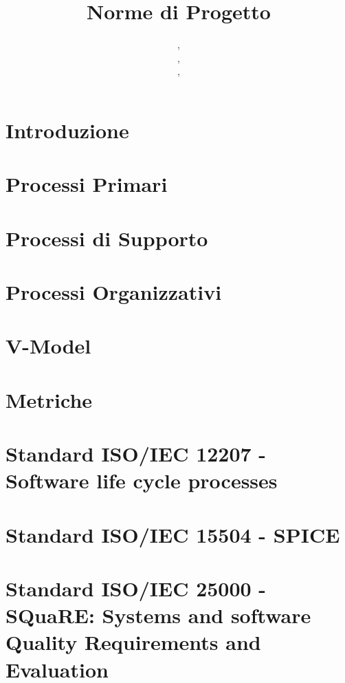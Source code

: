 \documentclass{classes/base}
\title{Norme di Progetto}
\author{\matteo, \\ \marcov, \\ \giulio, \\ \marcob}
\begin{document}
	\maketitle
	\newpage
	
	\newpage
	\tableofcontents
	\newpage
	\listoftables

	\newpage
	\section{Introduzione}
	
	
	\newpage
	\section{Processi Primari}
	
	
	\newpage
	\section{Processi di Supporto}
	
	
	\newpage
	\section{Processi Organizzativi}
	

	\newpage
	\section{V-Model}
	
	
	\newpage
	\section{Metriche}
	
	
	\newpage
	\section{Standard ISO/IEC 12207 - Software life cycle processes}
	
	
	\newpage
	\section{Standard ISO/IEC 15504 - SPICE}
	
	
	\newpage
	\section{Standard ISO/IEC 25000 - SQuaRE: Systems and software Quality
		Requirements and Evaluation} %
	
	
\end{document}
